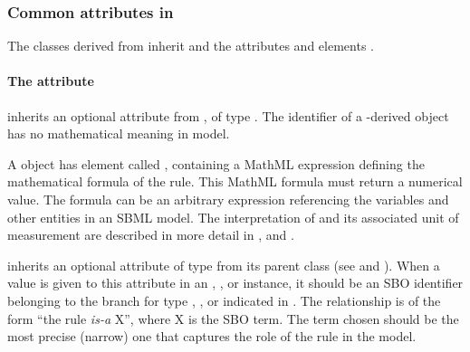 \subsubsection{Common attributes in }
\label{sec:rule-math}\label{sec:rule-fields}\label{sec:rule-sboterm}

The classes derived from \Rule inherit  and the attributes and elements .


\begin{blockChanged}
\paragraph{The  attribute}
\label{sec:rule-id}

\Rule inherits an optional  attribute from \SBase, of type .  The identifier of a \Rule-derived object has no mathematical meaning in  model.

\end{blockChanged}



A \Rule object has  element called ,
containing a MathML expression defining the mathematical formula
of the rule.  This MathML formula must return a numerical value.
The formula can be an arbitrary expression referencing the
variables and other entities in an SBML model.  The interpretation
of  and its associated unit of measurement are
described in more detail in ,
 and .



\Rule inherits an optional 
attribute of type  from its parent
class \SBase (see 
and ).  When a value is given to this
attribute in an \AlgebraicRule, \AssignmentRule, or
\RateRule instance, it should be an
SBO identifier belonging to the branch for type  \AlgebraicRule, \AssignmentRule, or
\RateRule indicated in .  The relationship is
of the form ``the rule \emph{is-a} X'', where X is
the SBO term.  The term chosen should be the most precise (narrow)
one that captures the role of the rule in the model.

